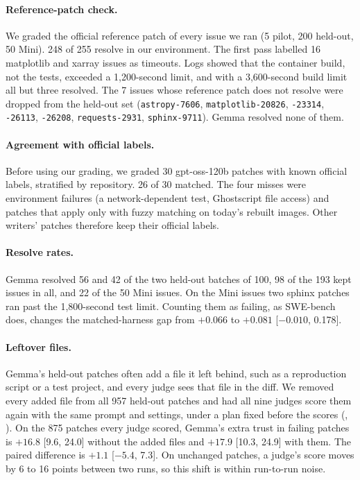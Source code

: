 \documentclass[10pt,letterpaper]{article}
\begin{document}
\paragraph{Reference-patch check.} We graded the official reference patch of every issue we ran (5 pilot, 200
held-out, 50 Mini). 248 of 255 resolve in our environment. The first pass labelled 16 matplotlib and xarray issues as
timeouts. Logs showed that the container build, not the tests, exceeded a 1,200-second limit, and with a 3,600-second build
limit all but three resolved. The 7 issues whose reference patch does not resolve were dropped from the held-out set
(\texttt{astropy-7606}, \texttt{matplotlib-20826}, \texttt{-23314}, \texttt{-26113}, \texttt{-26208},
\texttt{requests-2931}, \texttt{sphinx-9711}). Gemma resolved none of them.

\paragraph{Agreement with official labels.} Before using our grading, we graded 30 gpt-oss-120b patches with known
official labels, stratified by repository. 26 of 30 matched. The four misses were environment failures (a
network-dependent test, Ghostscript file access) and patches that apply only with fuzzy matching on today's rebuilt
images. Other writers' patches therefore keep their official labels.

\paragraph{Resolve rates.} Gemma resolved 56 and 42 of the two held-out batches of 100, 98 of the 193 kept issues in
all, and 22 of the 50 Mini issues. On the Mini issues two sphinx patches ran past the 1,800-second test limit.
Counting them as failing, as SWE-bench does, changes the matched-harness gap from $+0.066$ to $+0.081$ [$-0.010$,
0.178].

\paragraph{Leftover files.} Gemma's held-out patches often add a file it left behind, such as a reproduction script
or a test project, and every judge sees that file in the diff. We removed every added file from all 957 held-out
patches and had all nine judges score them again with the same prompt and settings, under a plan fixed before the
scores (, ). On the 875
patches every judge scored, Gemma's extra trust in failing patches is $+16.8$ [9.6, 24.0] without the added
files and $+17.9$ [10.3, 24.9] with them. The paired difference is $+1.1$ [$-5.4$, 7.3]. On unchanged patches, a
judge's score moves by 6 to 16 points between two runs, so this shift is within run-to-run noise.
\end{document}
